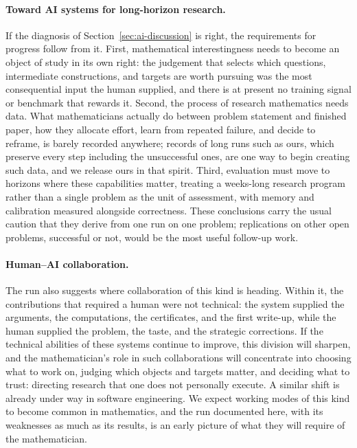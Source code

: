 \paragraph{Toward AI systems for long-horizon research.}
If the diagnosis of Section~\ref{sec:ai-discussion} is right, the
requirements for progress follow from it. First, mathematical
interestingness needs to become an object of study in its own right: the
judgement that selects which questions, intermediate constructions, and
targets are worth pursuing was the most consequential input the human
supplied, and there is at present no training signal or benchmark that
rewards it. Second, the process of research mathematics needs data. What
mathematicians actually do between problem statement and finished paper,
how they allocate effort, learn from repeated failure, and decide to
reframe, is barely recorded anywhere; records of long runs such as ours,
which preserve every step including the unsuccessful ones, are one way to
begin creating such data, and we release ours in that spirit. Third,
evaluation must move to horizons where these capabilities matter, treating
a weeks-long research program rather than a single problem as the unit of
assessment, with memory and calibration measured alongside correctness.
These conclusions carry the usual caution that they derive from one run on
one problem; replications on other open problems, successful or not, would
be the most useful follow-up work.

\paragraph{Human--AI collaboration.}
The run also suggests where collaboration of this kind is heading. Within
it, the contributions that required a human were not technical: the system
supplied the arguments, the computations, the certificates, and the first
write-up, while the human supplied the problem, the taste, and the
strategic corrections. If the technical abilities of these systems continue
to improve, this division will sharpen, and the mathematician's role in
such collaborations will concentrate into choosing what to work on, judging
which objects and targets matter, and deciding what to trust: directing
research that one does not personally execute. A similar shift is already
under way in software engineering. We expect working modes of this kind to
become common in mathematics, and the run documented here, with its
weaknesses as much as its results, is an early picture of what they will
require of the mathematician.

